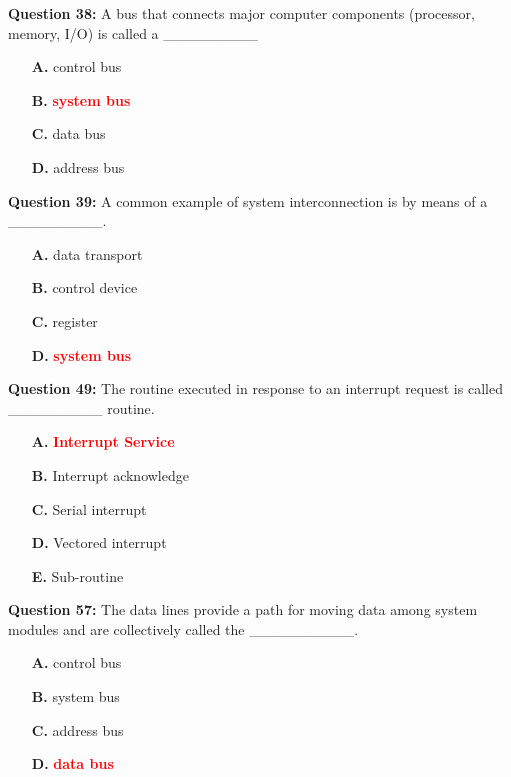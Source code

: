 \documentclass[12pt,a4paper]{article}
\begin{document}
\textbf{Question 38:} A bus that connects major computer components (processor, memory, I/O) is called a _________

\begin{itemize}
    \item[\textbf{A.}] control bus
    \item[\textbf{B.}] \textcolor{red}{\textbf{system bus}}
    \item[\textbf{C.}] data bus
    \item[\textbf{D.}] address bus
\end{itemize}

\vspace{0.5cm}

\textbf{Question 39:} A common example of system interconnection is by means of a _________.

\begin{itemize}
    \item[\textbf{A.}] data transport
    \item[\textbf{B.}] control device
    \item[\textbf{C.}] register
    \item[\textbf{D.}] \textcolor{red}{\textbf{system bus}}
\end{itemize}

\vspace{0.5cm}

\textbf{Question 49:} The routine executed in response to an interrupt request is called _________ routine.

\begin{itemize}
    \item[\textbf{A.}] \textcolor{red}{\textbf{Interrupt Service}}
    \item[\textbf{B.}] Interrupt acknowledge
    \item[\textbf{C.}] Serial interrupt
    \item[\textbf{D.}] Vectored interrupt
    \item[\textbf{E.}] Sub-routine
\end{itemize}

\vspace{0.5cm}

\textbf{Question 57:} The data lines provide a path for moving data among system modules and are collectively called the __________.

\begin{itemize}
    \item[\textbf{A.}] control bus
    \item[\textbf{B.}] system bus
    \item[\textbf{C.}] address bus
    \item[\textbf{D.}] \textcolor{red}{\textbf{data bus}}
\end{itemize}
\end{document}
